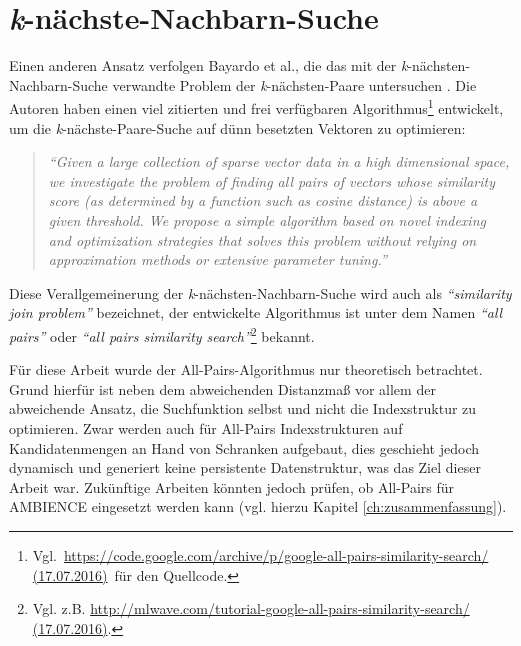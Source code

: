 \section{\textit{k}-nächste-Nachbarn-Suche}\label{sec:bloom-knn}
Einen anderen Ansatz verfolgen Bayardo et al., die das mit der \textit{k}-nächsten-Nachbarn-Suche verwandte Problem der \textit{k}-nächsten-Paare untersuchen \cite{Bayardo2007}. Die Autoren haben einen viel zitierten und frei verfügbaren Algorithmus\footnote{\mbox{Vgl. \url{https://code.google.com/archive/p/google-all-pairs-similarity-search/ (17.07.2016)} für} den Quell\-code.} entwickelt, um die \textit{k}-nächste-Paare-Suche auf dünn besetzten Vektoren zu optimieren: 
\begin{quote}
\textit{"`Given a large collection of sparse vector data in a high dimensional space, we investigate the problem of finding all pairs of vectors whose similarity score (as determined by a function such as cosine distance) is above a given threshold. We propose a simple algorithm based on novel indexing and optimization strategies that solves this problem without relying on approximation methods or extensive parameter tuning."'} \cite{Bayardo2007}
\end{quote}
Diese Verallgemeinerung der \textit{k}-nächsten-Nachbarn-Suche wird auch als \textit{"`similarity join problem"'} \cite{Bayardo2007} bezeichnet, der entwickelte Algorithmus ist unter dem Namen \textit{"`all pairs"'} oder \textit{"`all pairs similarity search"'}\footnote{Vgl. z.B. \url{http://mlwave.com/tutorial-google-all-pairs-similarity-search/ (17.07.2016)}.} bekannt. 

Für diese Arbeit wurde der All-Pairs-Algorithmus nur theoretisch betrachtet. Grund hierfür ist neben dem abweichenden Distanzmaß vor allem der abweichende Ansatz, die Suchfunktion selbst und nicht die Indexstruktur zu optimieren. Zwar werden auch für All-Pairs Indexstrukturen auf Kandidatenmengen an Hand von Schranken aufgebaut, dies geschieht jedoch dynamisch und generiert keine persistente Datenstruktur, was das Ziel dieser Arbeit war. Zukünftige Arbeiten könnten jedoch prüfen, ob All-Pairs für AMBIENCE eingesetzt werden kann (vgl. hierzu Kapitel \ref{ch:zusammenfassung}). 